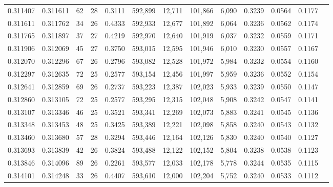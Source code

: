 \begin{tabular}{rrrrrrrrrrrrr}
0.311407 & 0.311611 &  62 &  28 &                                     0.3111 & 592,899 &  12,711 & 101,866 &   6,090 & 0.3239 & 0.0564 & 0.1177 \\
0.311611 & 0.311762 &  34 &  26 &                                     0.4333 & 592,933 &  12,677 & 101,892 &   6,064 & 0.3236 & 0.0562 & 0.1174 \\
0.311765 & 0.311897 &  37 &  27 &                                     0.4219 & 592,970 &  12,640 & 101,919 &   6,037 & 0.3232 & 0.0559 & 0.1171 \\
0.311906 & 0.312069 &  45 &  27 &                                     0.3750 & 593,015 &  12,595 & 101,946 &   6,010 & 0.3230 & 0.0557 & 0.1167 \\
0.312070 & 0.312296 &  67 &  26 &                                     0.2796 & 593,082 &  12,528 & 101,972 &   5,984 & 0.3232 & 0.0554 & 0.1160 \\
0.312297 & 0.312635 &  72 &  25 &                                     0.2577 & 593,154 &  12,456 & 101,997 &   5,959 & 0.3236 & 0.0552 & 0.1154 \\
0.312641 & 0.312859 &  69 &  26 &                                     0.2737 & 593,223 &  12,387 & 102,023 &   5,933 & 0.3239 & 0.0550 & 0.1147 \\
0.312860 & 0.313105 &  72 &  25 &                                     0.2577 & 593,295 &  12,315 & 102,048 &   5,908 & 0.3242 & 0.0547 & 0.1141 \\
0.313107 & 0.313346 &  46 &  25 &                                     0.3521 & 593,341 &  12,269 & 102,073 &   5,883 & 0.3241 & 0.0545 & 0.1136 \\
0.313348 & 0.313453 &  48 &  25 &                                     0.3425 & 593,389 &  12,221 & 102,098 &   5,858 & 0.3240 & 0.0543 & 0.1132 \\
0.313460 & 0.313680 &  57 &  28 &                                     0.3294 & 593,446 &  12,164 & 102,126 &   5,830 & 0.3240 & 0.0540 & 0.1127 \\
0.313693 & 0.313839 &  42 &  26 &                                     0.3824 & 593,488 &  12,122 & 102,152 &   5,804 & 0.3238 & 0.0538 & 0.1123 \\
0.313846 & 0.314096 &  89 &  26 &                                     0.2261 & 593,577 &  12,033 & 102,178 &   5,778 & 0.3244 & 0.0535 & 0.1115 \\
0.314101 & 0.314248 &  33 &  26 &                                     0.4407 & 593,610 &  12,000 & 102,204 &   5,752 & 0.3240 & 0.0533 & 0.1112 \\

\end{tabular}
